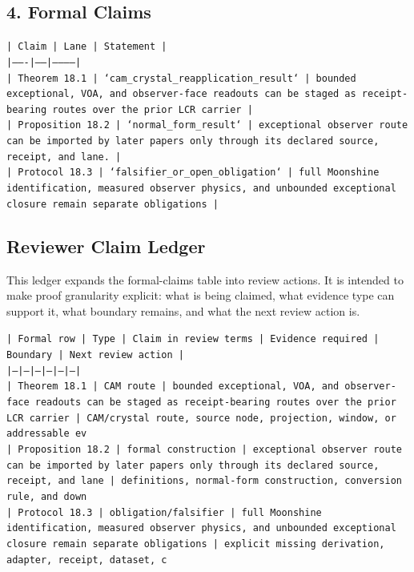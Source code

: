 \documentclass[11pt]{article}
\begin{document}
\subsection*{4. Formal Claims}

\noindent\texttt{| Claim | Lane | Statement |}\\
\noindent\texttt{|-------|------|-----------|}\\
\noindent\texttt{| Theorem 18.1 | `cam\_crystal\_reapplication\_result` | bounded exceptional, VOA, and observer-face readouts can be staged as receipt-bearing routes over the prior LCR carrier |}\\
\noindent\texttt{| Proposition 18.2 | `normal\_form\_result` | exceptional observer route can be imported by later papers only through its declared source, receipt, and lane. |}\\
\noindent\texttt{| Protocol 18.3 | `falsifier\_or\_open\_obligation` | full Moonshine identification, measured observer physics, and unbounded exceptional closure remain separate obligations |}\\

\subsection*{Reviewer Claim Ledger}

This ledger expands the formal-claims table into review actions. It is intended to make proof granularity explicit: what is being claimed, what evidence type can support it, what boundary remains, and what the next review action is.

\noindent\texttt{| Formal row | Type | Claim in review terms | Evidence required | Boundary | Next review action |}\\
\noindent\texttt{|---|---|---|---|---|---|}\\
\noindent\texttt{| Theorem 18.1 | CAM route | bounded exceptional, VOA, and observer-face readouts can be staged as receipt-bearing routes over the prior LCR carrier | CAM/crystal route, source node, projection, window, or addressable ev}\\
\noindent\texttt{| Proposition 18.2 | formal construction | exceptional observer route can be imported by later papers only through its declared source, receipt, and lane | definitions, normal-form construction, conversion rule, and down}\\
\noindent\texttt{| Protocol 18.3 | obligation/falsifier | full Moonshine identification, measured observer physics, and unbounded exceptional closure remain separate obligations | explicit missing derivation, adapter, receipt, dataset, c}\\
\end{document}
